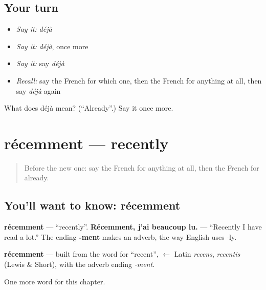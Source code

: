\subsection*{Your turn}
\begin{itemize}
\raggedright
  \item \emph{Say it:} \emph{déjà}
  \item \emph{Say it:} \emph{déjà}, once more
  \item \emph{Say it:} say \emph{déjà}
  \item \emph{Recall:} say the French for which one, then the French for anything at all, then say \emph{déjà} again
\end{itemize}

\begin{tcolorbox}[breakable,colback=teal!4,colframe=teal!35!black,title={Before you move on}]
What does déjà mean? (\textquotedblleft{}Already\textquotedblright{}.) Say it once more.
\end{tcolorbox}
\section[récemment]{récemment — recently}

\label{lesson:FR-C140-recemment}



\begin{quote}
Before the new one: say the French for anything at all, then the French for already.
\end{quote}

\subsection*{You'll want to know: récemment}
\textbf{récemment} — \textquotedblleft{}recently\textquotedblright{}. \textbf{Récemment, j'ai beaucoup lu.} — \textquotedblleft{}Recently I have read a lot.\textquotedblright{} The ending \textbf{-ment} makes an adverb, the way English uses -ly.

\begin{cousinweb}
\textbf{récemment} — built from the word for \textquotedblleft{}recent\textquotedblright{}, $\leftarrow$ Latin \emph{recens}, \emph{recentis} (Lewis \& Short), with the adverb ending \emph{-ment}.
\end{cousinweb}

\begin{grammarlens}[title={What you've built}]
One more word for this chapter.
\end{grammarlens}


